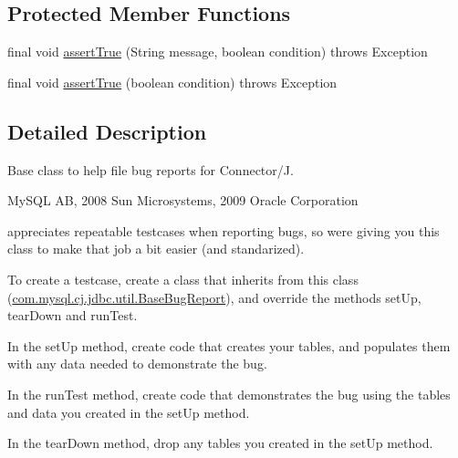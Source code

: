 \subsection*{Protected Member Functions}
\begin{DoxyCompactItemize}
\item 
final void \mbox{\hyperlink{classcom_1_1mysql_1_1cj_1_1jdbc_1_1util_1_1_base_bug_report_aeca0d41a625cbf52168bca12a8ba62c8}{assert\+True}} (String message, boolean condition)  throws Exception 
\item 
final void \mbox{\hyperlink{classcom_1_1mysql_1_1cj_1_1jdbc_1_1util_1_1_base_bug_report_a70e82a2b3e425014402a19483020f278}{assert\+True}} (boolean condition)  throws Exception 
\end{DoxyCompactItemize}


\subsection{Detailed Description}
Base class to help file bug reports for Connector/J.

My\+S\+QL AB, 2008 Sun Microsystems, 2009 Oracle Corporation


\begin{DoxyItemize}
\item 
\end{DoxyItemize}appreciates repeatable testcases when reporting bugs, so we\textquotesingle{}re giving you this class to make that job a bit easier (and standarized).

To create a testcase, create a class that inherits from this class (\mbox{\hyperlink{classcom_1_1mysql_1_1cj_1_1jdbc_1_1util_1_1_base_bug_report}{com.\+mysql.\+cj.\+jdbc.\+util.\+Base\+Bug\+Report}}), and override the methods \textquotesingle{}set\+Up\textquotesingle{}, \textquotesingle{}tear\+Down\textquotesingle{} and \textquotesingle{}run\+Test\textquotesingle{}.

In the \textquotesingle{}set\+Up\textquotesingle{} method, create code that creates your tables, and populates them with any data needed to demonstrate the bug.

In the \textquotesingle{}run\+Test\textquotesingle{} method, create code that demonstrates the bug using the tables and data you created in the \textquotesingle{}set\+Up\textquotesingle{} method.

In the \textquotesingle{}tear\+Down\textquotesingle{} method, drop any tables you created in the \textquotesingle{}set\+Up\textquotesingle{} method.

